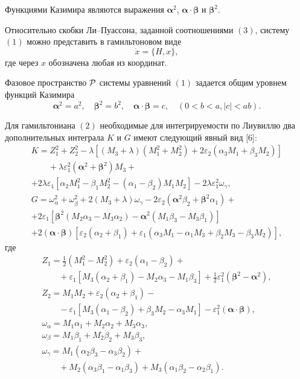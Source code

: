 Функциями Казимира являются выражения ${\boldsymbol\alpha}^2$,
${\boldsymbol\alpha}\cdot{\boldsymbol\beta}$ и ${\boldsymbol\beta}^2$.

Относительно
скобки Ли--Пуассона, заданной соотношениями $(3)$, систему $(1)$ можно
представить в гамильтоновом виде
\begin{equation*}
\dot x=\{H,x\},
\end{equation*}
где через $x$ обозначена любая из координат.

Фазовое пространство $\cal P$ системы уравнений $(1)$ задается общим уровнем функций Казимира
\begin{equation*}
\boldsymbol\alpha^2=a^2,\quad \boldsymbol\beta^2=b^2,\quad
{\boldsymbol\alpha}\cdot{\boldsymbol\beta}=c, \quad (0<b<a, |c|<ab).
\end{equation*}

Для гамильтониана $(2)$ необходимые для интегрируемости по Лиувиллю два дополнительных интеграла $K$ и $G$ имеют следующий явный вид [6]:
\begin{equation*}
\begin{array}{l}
K=Z_1^2+Z_2^2-\lambda[(M_3+\lambda)(M_1^2+M_2^2)+2\varepsilon_2(\alpha_3M_1+\beta_3M_2)]\\[3mm]
\qquad+\lambda\varepsilon_1^2({\boldsymbol\alpha}^2+{\boldsymbol\beta}^2)M_3+\\[3mm]
+2\lambda\varepsilon_1[\alpha_2M_1^2-\beta_1M_2^2-(\alpha_1-\beta_2)M_1M_2]
-2\lambda\varepsilon_1^2\omega_\gamma,\\[5mm]
G=\omega_\alpha^2+\omega_\beta^2+2(M_3+\lambda)\omega_\gamma-
2\varepsilon_2({\boldsymbol\alpha}^2\beta_2+{\boldsymbol\beta}^2\alpha_1)+\\[3mm]
+2\varepsilon_1[{\boldsymbol\beta}^2(M_2\alpha_3-M_3\alpha_2)-
{\boldsymbol\alpha}^2(M_1\beta_3-M_3\beta_1)]\\[3mm]
+2({\boldsymbol\alpha}\cdot{\boldsymbol\beta})[\varepsilon_2(\alpha_2+\beta_1)+\varepsilon_1(\alpha_3M_1-\alpha_1M_3+\beta_2M_3-\beta_3M_2)],
\end{array}
\end{equation*}
где
\begin{equation*}
\begin{array}{l}
Z_1=\frac{1}{2}(M_1^2-M_2^2)+\varepsilon_2(\alpha_1-\beta_2)+\\[3mm]
\qquad+\varepsilon_1[M_3(\alpha_2+\beta_1)-M_2\alpha_3-M_1\beta_3]+
\frac{1}{2}\varepsilon_1^2({\boldsymbol\beta}^2-{\boldsymbol\alpha}^2),\\[3mm]
Z_2=M_1M_2+\varepsilon_2(\alpha_2+\beta_1)-\\[3mm]
\qquad-\varepsilon_1[M_3(\alpha_1-\beta_2)+\beta_3M_2-\alpha_3M_1]-\varepsilon_1^2(
{\boldsymbol\alpha}\cdot{\boldsymbol\beta}),\\[3mm]
\omega_\alpha=M_1\alpha_1+M_2\alpha_2+M_3\alpha_3,\\[3mm]
\omega_\beta=M_1\beta_1+M_2\beta_2+M_3\beta_3,\\[3mm]
\omega_\gamma=M_1(\alpha_2\beta_3-\alpha_3\beta_2)+\\[3mm]
\qquad +M_2(\alpha_3\beta_1-\alpha_1\beta_3)+
M_3(\alpha_1\beta_2-\alpha_2\beta_1).
\end{array}
\end{equation*}

